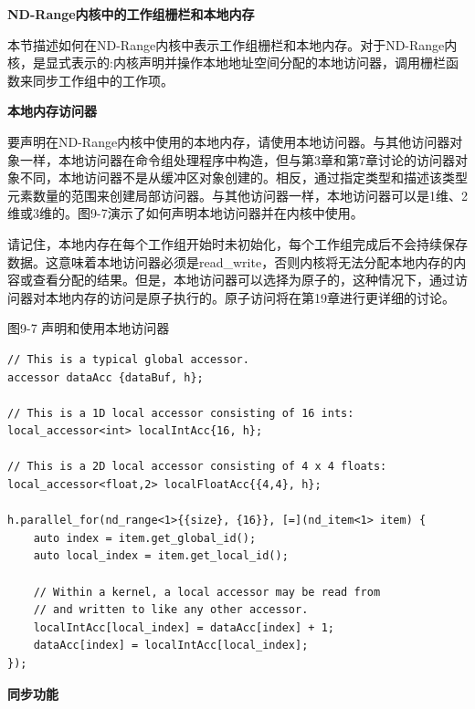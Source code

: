 \hspace*{\fill} \par %
\textbf{ND-Range内核中的工作组栅栏和本地内存}

本节描述如何在ND-Range内核中表示工作组栅栏和本地内存。对于ND-Range内核，是显式表示的:内核声明并操作本地地址空间分配的本地访问器，调用栅栏函数来同步工作组中的工作项。\par

\hspace*{\fill} \par %
\textbf{本地内存访问器}

要声明在ND-Range内核中使用的本地内存，请使用本地访问器。与其他访问器对象一样，本地访问器在命令组处理程序中构造，但与第3章和第7章讨论的访问器对象不同，本地访问器不是从缓冲区对象创建的。相反，通过指定类型和描述该类型元素数量的范围来创建局部访问器。与其他访问器一样，本地访问器可以是1维、2维或3维的。图9-7演示了如何声明本地访问器并在内核中使用。\par

请记住，本地内存在每个工作组开始时未初始化，每个工作组完成后不会持续保存数据。这意味着本地访问器必须是read\_write，否则内核将无法分配本地内存的内容或查看分配的结果。但是，本地访问器可以选择为原子的，这种情况下，通过访问器对本地内存的访问是原子执行的。原子访问将在第19章进行更详细的讨论。\par

\hspace*{\fill} \par %
图9-7 声明和使用本地访问器
\begin{lstlisting}[caption={}]
// This is a typical global accessor.
accessor dataAcc {dataBuf, h};

// This is a 1D local accessor consisting of 16 ints:
local_accessor<int> localIntAcc{16, h};

// This is a 2D local accessor consisting of 4 x 4 floats:
local_accessor<float,2> localFloatAcc{{4,4}, h};

h.parallel_for(nd_range<1>{{size}, {16}}, [=](nd_item<1> item) {
	auto index = item.get_global_id();
	auto local_index = item.get_local_id();
	
	// Within a kernel, a local accessor may be read from
	// and written to like any other accessor.
	localIntAcc[local_index] = dataAcc[index] + 1;
	dataAcc[index] = localIntAcc[local_index];
});
\end{lstlisting}

\hspace*{\fill} \par %
\textbf{同步功能}

